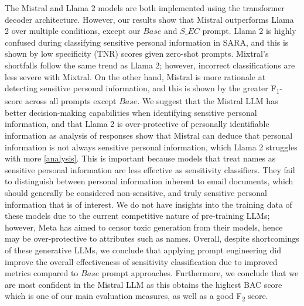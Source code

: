 The Mistral and Llama 2 models are both implemented using the transformer decoder architecture. However, our results show that Mistral outperforms Llama 2 over multiple conditions, except our $Base$ and $S\_EC$ prompt. Llama 2 is highly confused during classifying sensitive personal information in SARA, and this is shown by low specificity (TNR) scores given zero-shot prompts. Mixtral's shortfalls follow the same trend as Llama 2; however, incorrect classifications are less severe with Mixtral. On the other hand, Mistral is more rationale at detecting sensitive personal information, and this is shown by the greater F\textsubscript{1}-score across all prompts except $Base$. We suggest that the Mistral LLM has better decision-making capabilities when identifying sensitive personal information, and that Llama 2 is over-protective of personally identifiable information as analysis of responses show that Mistral can deduce that personal information is not always sensitive personal information, which Llama 2 struggles with more \ref{analysis}. This is important because models that treat names as sensitive personal information are less effective as sensitivity classifiers. They fail to distinguish between personal information inherent to email documents, which should generally be considered non-sensitive, and truly sensitive personal information that is of interest. We do not have insights into the training data of these models due to the current competitive nature of pre-training LLMs; however, Meta has aimed to censor toxic generation from their models, hence may be over-protective to attributes such as names. Overall, despite shortcomings of these generative LLMs, we conclude that applying prompt engineering did improve the overall effectiveness of sensitivity classification due to improved metrics compared to $Base$ prompt approaches. Furthermore, we conclude that we are most confident in the Mistral LLM as this obtains the highest BAC score which is one of our main evaluation measures, as well as a good F\textsubscript{2} score. 

